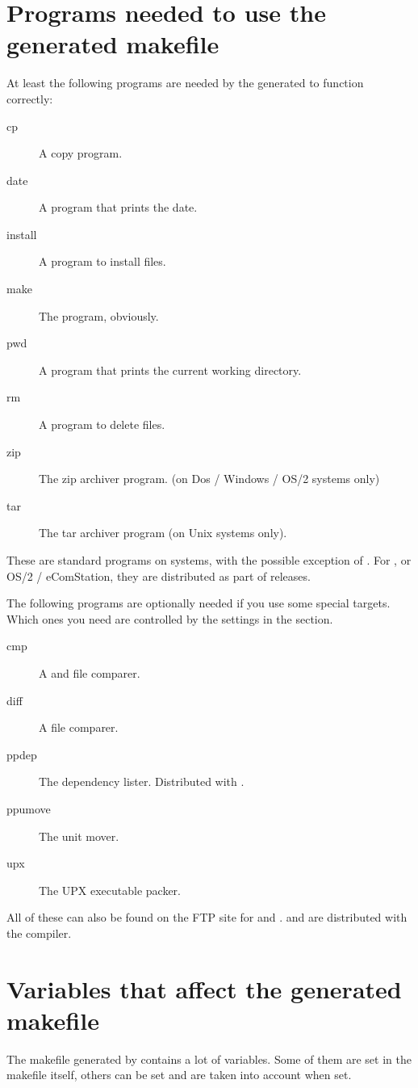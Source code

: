 \section{Programs needed to use the generated makefile}
At least the following programs are needed by the generated 
to function correctly:
\begin{description}
\item[cp] A copy program.
\item[date] A program that prints the date.
\item[install] A program to install files.
\item[make] The  program, obviously.
\item[pwd] A program that prints the current working directory.
\item[rm] A program to delete files.
\item[zip] The zip archiver program. (on Dos / Windows / OS/2 systems only)
\item[tar] The tar archiver program (on Unix systems only).
\end{description}
These are standard programs on \linux systems, with the possible exception of
. For \dos, \windowsnt or OS/2 / eComStation, they are distributed
as part of \fpc releases.

The following programs are optionally needed if you use some special targets.
Which ones you need are controlled by the settings in the  section.
\begin{description}
\item[cmp] A \dos and \windowsnt file comparer. 
\item[diff] A file comparer. 
\item[ppdep] The  dependency lister. Distributed with \fpc.
\item[ppumove] The \fpc unit mover. 
\item[upx] The UPX executable packer.
\end{description}
All of these can also be found on the \fpc FTP site for \dos and \windowsnt.
 and  are distributed with the \fpc
compiler.

%
\section{Variables that affect the generated makefile}
The makefile generated by \fpcmake{} contains a lot of variables.
Some of them are set in the makefile itself, others can be set and are taken
into account when set.

